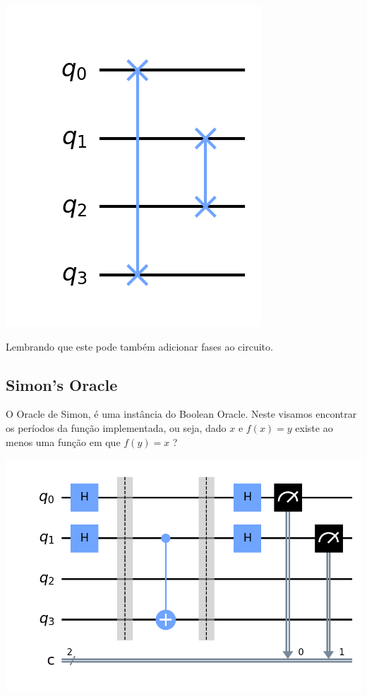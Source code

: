 \documentclass{article}
\begin{document}
\begin{center}
	\includegraphics[scale=0.3]{minimal-oracle.png}
	\label{fig:minimal-oracle}
\end{center}

Lembrando que este pode também adicionar fases ao circuito.

\subsection{Simon's Oracle}

O Oracle de Simon, é uma instância do Boolean Oracle. Neste visamos encontrar os períodos da função implementada, ou seja, dado $x$ e $f(x) = y$ existe ao menos uma função em que $f(y) = x$ ?


\begin{center}
	\includegraphics[scale=0.3]{simons.png}
	\label{fig:simons-oracle}
\end{center}
\end{document}
